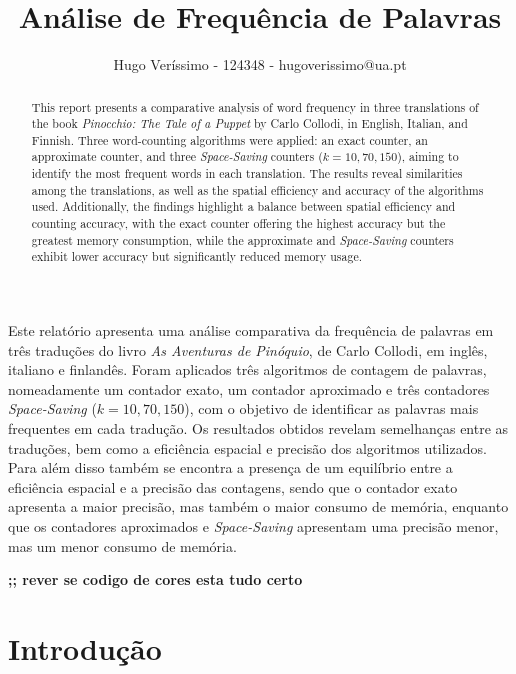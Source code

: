\documentclass[mirror, portugues]{revdetua}
\begin{document}

\title{Análise de Frequência de Palavras}
\author{Hugo Veríssimo - 124348 - hugoverissimo@ua.pt}
\maketitle

\begin{abstract}
This report presents a comparative analysis of word frequency in three translations of the book \textit{Pinocchio: The Tale of a Puppet} by Carlo Collodi, in English, Italian, and Finnish. Three word-counting algorithms were applied: an exact counter, an approximate counter, and three \textit{Space-Saving} counters ($k = 10, 70, 150$), aiming to identify the most frequent words in each translation. The results reveal similarities among the translations, as well as the spatial efficiency and accuracy of the algorithms used. Additionally, the findings highlight a balance between spatial efficiency and counting accuracy, with the exact counter offering the highest accuracy but the greatest memory consumption, while the approximate and \textit{Space-Saving} counters exhibit lower accuracy but significantly reduced memory usage.
\end{abstract}

\begin{resumo}
Este relatório apresenta uma análise comparativa da frequência de palavras em três traduções do livro \textit{As Aventuras de Pinóquio}, de Carlo Collodi, em inglês, italiano e finlandês. Foram aplicados três algoritmos de contagem de palavras, nomeadamente um contador exato, um contador aproximado e três contadores \textit{Space-Saving} ($k = 10, 70, 150$), com o objetivo de identificar as palavras mais frequentes em cada tradução. Os resultados obtidos revelam semelhanças entre as traduções, bem como a eficiência espacial e precisão dos algoritmos utilizados. Para além disso também se encontra a presença de um equilíbrio entre a eficiência espacial e a precisão das contagens, sendo que o contador exato apresenta a maior precisão, mas também o maior consumo de memória, enquanto que os contadores aproximados e \textit{Space-Saving} apresentam uma precisão menor, mas um menor consumo de memória.
\end{resumo}

\textbf{;; rever se codigo de cores esta tudo certo}

\section{Introdução}
\end{document}
